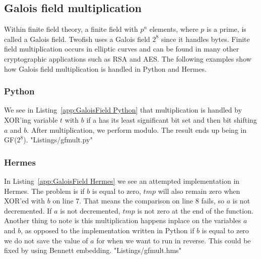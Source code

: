 \subsection{Galois field multiplication}
Within finite field theory, a finite field with $p^n$ elements, where $p$ is a prime, is called a Galois field.
Twofish uses a Galois field $2^8$ since it handles bytes.
Finite field multiplication occurs in elliptic curves and can be found in many other cryptographic applications such as RSA and AES.
The following examples show how Galois field multiplication is handled in Python and Hermes.

\subsubsection{Python}
We see in Listing~\ref{app:GaloisField Python} that multiplication is handled by XOR'ing variable $t$ with $b$ if a has its least significant bit set and then bit shifting $a$ and $b$.
After multiplication, we perform modulo. The result ends up being in GF($2^8$).
 {"Listings/gfmult.py"}

\subsubsection{Hermes}
In Listing~\ref{app:GaloisField Hermes} we see an attempted implementation in Hermes.
The problem is if $b$ is equal to zero, $tmp$ will also remain zero when XOR'ed with $b$ on line 7.
That means the comparison on line 8 fails, so $a$ is not decremented.
If $a$ is not decremented, $tmp$ is not zero at the end of the function.
Another thing to note is this multiplication happens inplace on the variables $a$ and $b$, as opposed to the implementation written in Python if $b$ is equal to zero we do not save the value of $a$ for when we want to run in reverse.
This could be fixed by using Bennett embedding.
 {"Listings/gfmult.hms"}
